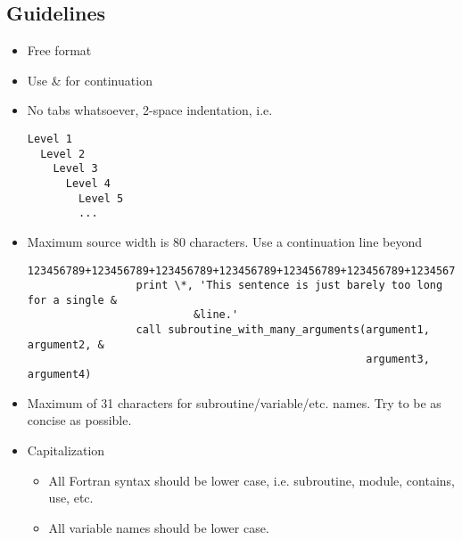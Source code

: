 

\subsection*{Guidelines}

\begin{itemize}
\item Free format

\item Use \& for continuation

\item No tabs whatsoever, 2-space indentation, i.e.

\begin{mdframed}
\begin{Verbatim}
Level 1
  Level 2
    Level 3
      Level 4
        Level 5
        ...
\end{Verbatim}
\end{mdframed}

\item Maximum source width is 80 characters. Use a continuation line beyond

\begin{mdframed}
\begin{Verbatim}
123456789+123456789+123456789+123456789+123456789+123456789+123456789+123456789+
                 print \*, 'This sentence is just barely too long for a single &
                          &line.'
                 call subroutine_with_many_arguments(argument1, argument2, &
                                                     argument3, argument4)
\end{Verbatim}
\end{mdframed}

\item Maximum of 31 characters for subroutine/variable/etc.\! names. Try to be as concise as possible.

\item Capitalization
\begin{itemize}
\item All Fortran syntax should be lower case, i.e. subroutine, module, contains, use, etc.
\item All variable names should be lower case.


\end{itemize}
\end{itemize}

